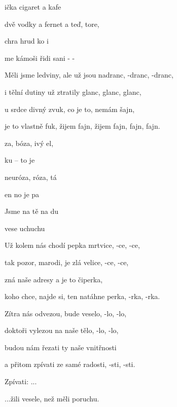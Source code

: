 

\zs
{}ička cigaret a  kafe   

dvě vodky a fernet a teď, tore,   

chra hrud ko  i

me kámoši řidi sani - -
\ks

\zs
Měli jsme ledviny, ale už jsou nadranc, -dranc, -dranc,

i tělní dutiny už ztratily glanc, glanc, glanc,

u srdce divný zvuk, co je to, nemám šajn,

je to vlastně fuk, žijem fajn, žijem fajn, fajn, fajn.
\ks

\zr
{}za, bóza, ivý el,

ku --  to je 

neuróza, róza, tá 

en no  je pa

Jsme  na tě  na du

 vese uchuchu
\kr

\zs
Už kolem nás chodí pepka mrtvice, -ce, -ce,

tak pozor, marodi, je zlá velice, -ce, -ce,

zná naše adresy a je to čiperka,

koho chce, najde si, ten natáhne perka, -rka, -rka.
\ks

\zs
Zítra nás odvezou, bude veselo, -lo, -lo,

doktoři vylezou na naše tělo, -lo, -lo,

budou nám řezati ty naše vnitřnosti

a přitom zpívati ze samé radosti, -sti, -sti.
\ks

\zr
Zpívati: ...

...žili vesele, než měli poruchu.
\kr


\kp






